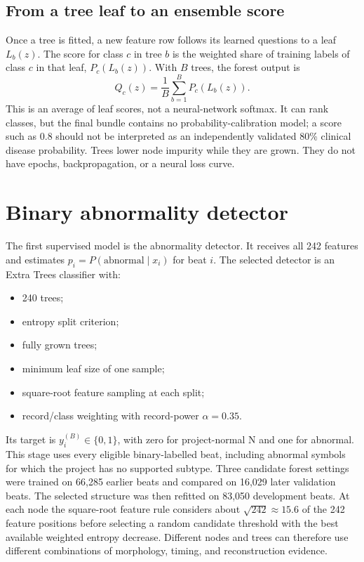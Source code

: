 \subsection{From a tree leaf to an ensemble score}

Once a tree is fitted, a new feature row follows its learned questions to a
leaf $L_b(z)$. The score for class $c$ in tree $b$ is the weighted share of
training labels of class $c$ in that leaf,
$P_c(L_b(z))$. With $B$ trees, the forest output is
\begin{equation}
 Q_c(z)=\frac{1}{B}\sum_{b=1}^{B}P_c(L_b(z)).
 \label{eq:method-forest-score}
\end{equation}
This is an average of leaf scores, not a neural-network softmax. It can rank
classes, but the final bundle contains no probability-calibration model; a
score such as 0.8 should not be interpreted as an independently validated
80\% clinical disease probability. Trees lower node impurity while they are
grown. They do not have epochs, backpropagation, or a neural loss curve.

\section{Binary abnormality detector}

The first supervised model is the abnormality detector. It receives all 242
features and estimates $p_i=P(\mathrm{abnormal}\mid x_i)$ for beat $i$. The
selected detector is an Extra Trees classifier with:
\begin{itemize}
\item 240 trees;
\item entropy split criterion;
\item fully grown trees;
\item minimum leaf size of one sample;
\item square-root feature sampling at each split;
\item record/class weighting with record-power $\alpha=0.35$.
\end{itemize}
Its target is $y_i^{(B)}\in\{0,1\}$, with zero for project-normal N and one
for abnormal. This stage uses every eligible binary-labelled beat, including
abnormal symbols for which the project has no supported subtype. Three
candidate forest settings were trained on 66,285 earlier beats and compared
on 16,029 later validation beats. The selected structure was then refitted
on 83,050 development beats. At each node the square-root feature rule
considers about $\sqrt{242}\approx15.6$ of the 242 feature positions
before selecting a random candidate threshold with the best available
weighted entropy decrease. Different nodes and trees can therefore use
different combinations of morphology, timing, and reconstruction evidence.

